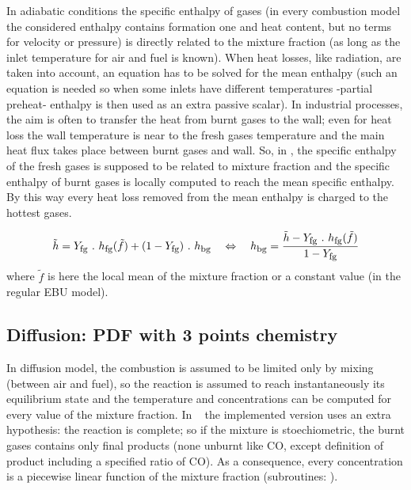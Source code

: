 In adiabatic conditions the specific enthalpy of gases ({\small in every
  combustion model the considered enthalpy contains formation one and heat
  content, but no terms for velocity or pressure}) is directly related to the
mixture fraction ({\small as long as the inlet temperature for air and fuel is
  known}). When heat losses, like radiation, are taken into account, an equation
has to be solved for the mean enthalpy ({\small such an equation is needed so
  when some inlets have different temperatures -partial preheat- enthalpy is
  then used as an extra passive scalar}). In industrial processes, the aim is
often to transfer the heat from burnt gases to the wall; even for heat loss the
wall temperature is near to the fresh gases temperature and the main heat flux
takes place between burnt gases and wall. So, in \CS, the specific enthalpy of
the fresh gases is supposed to be related to mixture fraction and the specific
enthalpy of burnt gases is locally computed to reach the mean specific
enthalpy. By this way every heat loss removed from the mean enthalpy is charged
to the hottest gases.

\begin{equation}
\tilde h = Y_{\mbox{\footnotesize fg}}~.~h_{\mbox{\footnotesize fg}}( \tilde f) + (1-Y_{\mbox{\footnotesize fg}})~.~h_{\mbox{\footnotesize bg}} \quad \Leftrightarrow \quad
                  h_{\mbox{\footnotesize bg}}  = \frac{ \tilde h-Y_{\mbox{\footnotesize fg}}~.~h_{\mbox{\footnotesize fg}}(\tilde f) }{ 1-Y_{\mbox{\footnotesize fg}} }
\end{equation}
%
where $\tilde f$ is here the local mean of the mixture fraction or a constant value ({\small in the regular EBU model}).

\subsection{Diffusion: PDF with 3 points chemistry}

In diffusion model, the combustion is assumed to be limited only by mixing
(between air and fuel), so the reaction is assumed to reach instantaneously its
equilibrium state and the temperature and concentrations can be computed for
every value of the mixture fraction. In \CS~ the implemented version uses an
extra hypothesis: the reaction is complete; so if the mixture is
stoechiometric, the burnt gases contains only final products (none unburnt like
CO, except definition of product including a specified ratio of CO).  As a
consequence, every concentration is a piecewise linear function of the mixture
fraction (subroutines: ).

